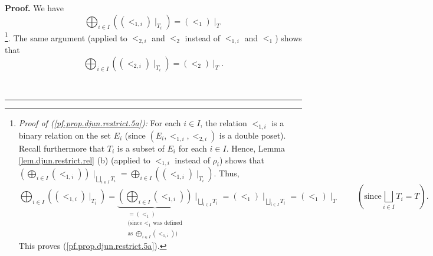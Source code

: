 \documentclass[numbers=enddot,12pt,final,onecolumn,notitlepage,abstracton]{scrartcl}
\theoremstyle{definition}
\newenvironment{proof}[1][Proof]{\noindent\textbf{#1.} }{\ \rule{0.5em}{0.5em}}
\newenvironment{verlong}{}{}
\begin{document}
\begin{verlong}
\begin{footnotesize}
\begin{proof}
We have%
\begin{equation}
\bigoplus_{i\in I}\left(  \left(  <_{1,i}\right)  \mid_{T_{i}}\right)
=\left(  <_{1}\right)  \mid_{T} \label{pf.prop.djun.restrict.5a}%
\end{equation}
\footnote{\textit{Proof of (\ref{pf.prop.djun.restrict.5a}):} For each $i\in
I$, the relation $<_{1,i}$ is a binary relation on the set $E_{i}$ (since
$\left(  E_{i},<_{1,i},<_{2,i}\right)  $ is a double poset). Recall
furthermore that $T_{i}$ is a subset of $E_{i}$ for each $i\in I$. Hence,
Lemma \ref{lem.djun.restrict.rel} (b) (applied to $<_{1,i}$ instead of
$\rho_{i}$) shows that $\left(  \bigoplus_{i\in I}\left(  <_{1,i}\right)
\right)  \mid_{\bigsqcup_{i\in I}T_{i}}=\bigoplus_{i\in I}\left(  \left(
<_{1,i}\right)  \mid_{T_{i}}\right)  $. Thus,%
\[
\bigoplus_{i\in I}\left(  \left(  <_{1,i}\right)  \mid_{T_{i}}\right)
=\underbrace{\left(  \bigoplus_{i\in I}\left(  <_{1,i}\right)  \right)
}_{\substack{=\left(  <_{1}\right)  \\\text{(since }<_{1}\text{ was
defined}\\\text{as }\bigoplus_{i\in I}\left(  <_{1,i}\right)  \text{)}}%
}\mid_{\bigsqcup_{i\in I}T_{i}}=\left(  <_{1}\right)  \mid_{\bigsqcup_{i\in
I}T_{i}}=\left(  <_{1}\right)  \mid_{T}\ \ \ \ \ \ \ \ \ \ \left(  \text{since
}\bigsqcup_{i\in I}T_{i}=T\right)  .
\]
This proves (\ref{pf.prop.djun.restrict.5a}).}. The same argument (applied to
$<_{2,i}$ and $<_{2}$ instead of $<_{1,i}$ and $<_{1}$) shows that%
\begin{equation}
\bigoplus_{i\in I}\left(  \left(  <_{2,i}\right)  \mid_{T_{i}}\right)
=\left(  <_{2}\right)  \mid_{T}. \label{pf.prop.djun.restrict.5b}%
\end{equation}



\end{proof}
\end{footnotesize}
\end{verlong}
\end{document}
